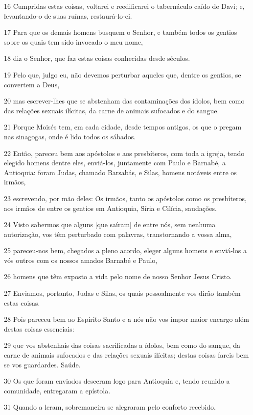 \par 16 Cumpridas estas coisas, voltarei e reedificarei o tabernáculo caído de Davi; e, levantando-o de suas ruínas, restaurá-lo-ei.
\par 17 Para que os demais homens busquem o Senhor, e também todos os gentios sobre os quais tem sido invocado o meu nome,
\par 18 diz o Senhor, que faz estas coisas conhecidas desde séculos.
\par 19 Pelo que, julgo eu, não devemos perturbar aqueles que, dentre os gentios, se convertem a Deus,
\par 20 mas escrever-lhes que se abstenham das contaminações dos ídolos, bem como das relações sexuais ilícitas, da carne de animais sufocados e do sangue.
\par 21 Porque Moisés tem, em cada cidade, desde tempos antigos, os que o pregam nas sinagogas, onde é lido todos os sábados.
\par 22 Então, pareceu bem aos apóstolos e aos presbíteros, com toda a igreja, tendo elegido homens dentre eles, enviá-los, juntamente com Paulo e Barnabé, a Antioquia: foram Judas, chamado Barsabás, e Silas, homens notáveis entre os irmãos,
\par 23 escrevendo, por mão deles: Os irmãos, tanto os apóstolos como os presbíteros, aos irmãos de entre os gentios em Antioquia, Síria e Cilícia, saudações.
\par 24 Visto sabermos que alguns [que saíram] de entre nós, sem nenhuma autorização, vos têm perturbado com palavras, transtornando a vossa alma,
\par 25 pareceu-nos bem, chegados a pleno acordo, eleger alguns homens e enviá-los a vós outros com os nossos amados Barnabé e Paulo,
\par 26 homens que têm exposto a vida pelo nome de nosso Senhor Jesus Cristo.
\par 27 Enviamos, portanto, Judas e Silas, os quais pessoalmente vos dirão também estas coisas.
\par 28 Pois pareceu bem ao Espírito Santo e a nós não vos impor maior encargo além destas coisas essenciais:
\par 29 que vos abstenhais das coisas sacrificadas a ídolos, bem como do sangue, da carne de animais sufocados e das relações sexuais ilícitas; destas coisas fareis bem se vos guardardes. Saúde.
\par 30 Os que foram enviados desceram logo para Antioquia e, tendo reunido a comunidade, entregaram a epístola.
\par 31 Quando a leram, sobremaneira se alegraram pelo conforto recebido.

